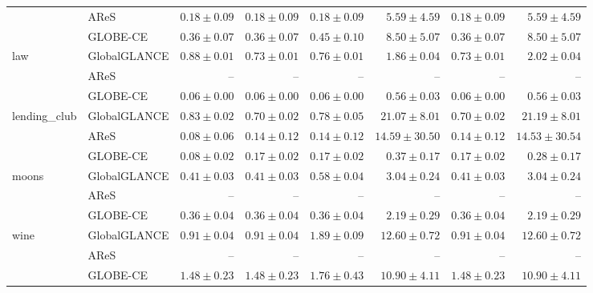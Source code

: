 \begin{table}[ht]
\begin{center}
\begin{sc}
\begin{scriptsize}
\begin{tabular}{l|l|rrrrrr}
 & AReS & $\boldsymbol{0.18\pm{0.09}}$ & $\boldsymbol{0.18\pm{0.09}}$ & $\boldsymbol{0.18\pm{0.09}}$ & $\boldsymbol{5.59\pm{4.59}}$ & $\boldsymbol{0.18\pm{0.09}}$ & $\boldsymbol{5.59\pm{4.59}}$ \\
 & GLOBE-CE & $0.36\pm{0.07}$ & $0.36\pm{0.07}$ & $0.45\pm{0.10}$ & $8.50\pm{5.07}$ & $0.36\pm{0.07}$ & $8.50\pm{5.07}$ \\
\midrule
\multirow{3}{*}{law} & GlobalGLANCE & $0.88\pm{0.01}$ & $0.73\pm{0.01}$ & $0.76\pm{0.01}$ & $1.86\pm{0.04}$ & $0.73\pm{0.01}$ & $2.02\pm{0.04}$ \\
 & AReS & -- & -- & -- & -- & -- & -- \\
 & GLOBE-CE & $\boldsymbol{0.06\pm{0.00}}$ & $\boldsymbol{0.06\pm{0.00}}$ & $\boldsymbol{0.06\pm{0.00}}$ & $\boldsymbol{0.56\pm{0.03}}$ & $\boldsymbol{0.06\pm{0.00}}$ & $\boldsymbol{0.56\pm{0.03}}$ \\
\midrule
\multirow{3}{*}{lending\_club} & GlobalGLANCE & $0.83\pm{0.02}$ & $0.70\pm{0.02}$ & $0.78\pm{0.05}$ & $21.07\pm{8.01}$ & $0.70\pm{0.02}$ & $21.19\pm{8.01}$ \\
 & AReS & $\boldsymbol{0.08\pm{0.06}}$ & $\boldsymbol{0.14\pm{0.12}}$ & $\boldsymbol{0.14\pm{0.12}}$ & $14.59\pm{30.50}$ & $\boldsymbol{0.14\pm{0.12}}$ & $14.53\pm{30.54}$ \\
 & GLOBE-CE & $\boldsymbol{0.08\pm{0.02}}$ & $0.17\pm{0.02}$ & $0.17\pm{0.02}$ & $\boldsymbol{0.37\pm{0.17}}$ & $0.17\pm{0.02}$ & $\boldsymbol{0.28\pm{0.17}}$ \\
\midrule
\multirow{3}{*}{moons} & GlobalGLANCE & $0.41\pm{0.03}$ & $0.41\pm{0.03}$ & $0.58\pm{0.04}$ & $3.04\pm{0.24}$ & $0.41\pm{0.03}$ & $3.04\pm{0.24}$ \\
 & AReS & -- & -- & -- & -- & -- & -- \\
 & GLOBE-CE & $\boldsymbol{0.36\pm{0.04}}$ & $\boldsymbol{0.36\pm{0.04}}$ & $\boldsymbol{0.36\pm{0.04}}$ & $\boldsymbol{2.19\pm{0.29}}$ & $\boldsymbol{0.36\pm{0.04}}$ & $\boldsymbol{2.19\pm{0.29}}$ \\
\midrule
\multirow{3}{*}{wine} & GlobalGLANCE & $\boldsymbol{0.91\pm{0.04}}$ & $\boldsymbol{0.91\pm{0.04}}$ & $1.89\pm{0.09}$ & $12.60\pm{0.72}$ & $\boldsymbol{0.91\pm{0.04}}$ & $12.60\pm{0.72}$ \\
 & AReS & -- & -- & -- & -- & -- & -- \\
 & GLOBE-CE & $1.48\pm{0.23}$ & $1.48\pm{0.23}$ & $\boldsymbol{1.76\pm{0.43}}$ & $\boldsymbol{10.90\pm{4.11}}$ & $1.48\pm{0.23}$ & $\boldsymbol{10.90\pm{4.11}}$ \\
\bottomrule
\end{tabular}
\end{scriptsize}
\end{sc}
\end{center}
\end{table}

